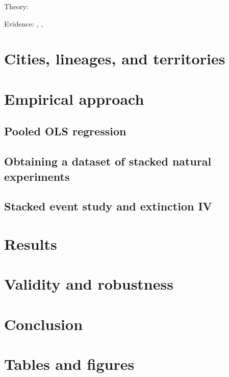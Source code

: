 \documentclass{article}
\begin{document}
Theory: \cite{besley2017}

Evidence: \cite{olken2005}, \cite{dube2020}, \cite{ottinger2022}


\section{Cities, lineages, and territories}

\section{Empirical approach}

\subsection{Pooled OLS regression}

\subsection{Obtaining a dataset of stacked natural experiments}

\subsection{Stacked event study and extinction IV}

\section{Results}

\section{Validity and robustness}

\section{Conclusion}



\newpage
\onehalfspacing



\newpage
\section*{Tables and figures}
\end{document}

